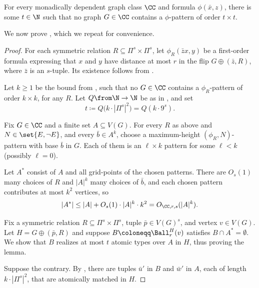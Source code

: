 \begin{corollary}\label{lem:forbidden-patterns}
        For every monadically dependent graph class $\CC$ and formula $\phi(\bar x,z)$, there is some $t\in \N$ such that no graph $G\in \CC$ contains a $\phi$-pattern of order $t \times t$.
\end{corollary}

We now prove , which we repeat for convenience.

\lemBallTypes*
\begin{proof}
    For each symmetric relation $R\subseteq\Pi^s \times \Pi^s$, let $\phi_R(\bar z x,y)$ be a first-order formula expressing that $x$ and $y$ have distance at most $r$ in the flip $G\oplus(\bar z,R)$, where $\bar z$ is an $s$-tuple.
Its existence follows from .

Let $k\ge 1$ be the bound from
     , such that no $G\in\CC$ contains a $\phi_R$-pattern of order $k\times k$, for any $R$.
    Let $Q\from\N\to\N$ be as in , and set
    \[
        t\coloneqq Q\big(k \cdot |\Pi^s|^2\big)=Q(k\cdot 9^s).
    \]

    Fix $G\in\CC$ and a finite set $A\subseteq V(G)$.
    For every $R$ as above and $N\in \set{E,\neg E}$, and every $\bar b\in A^k$, choose a maximum-height $(\phi_R,N)$-pattern with base $\bar b$ in $G$. Each of them is an $\ell\times k$ pattern for some $\ell<k$ (possibly $\ell=0$).

    Let $A^*$ consist of $A$ and all grid-points of the chosen patterns.
    There are $O_s(1)$ many choices of $R$ and $|A|^k$ many choices of $\bar b$, and each chosen pattern contributes at most $k^2$ vertices, so
    \[
        |A^*|\leq |A|+O_s(1)\cdot|A|^k\cdot k^2
        =O_{\CC,r,s}(|A|^k).
    \]

    Fix a symmetric relation $R\subseteq\Pi^s \times \Pi^s$, tuple $\bar p \in V(G)^s$, and vertex $v \in V(G)$. Let
    $H=G\oplus(\bar p,R)$ and suppose $B\coloneqq \Ball_r^H(v)$ satisfies $B\cap A^*=\emptyset$.
    We show that $B$ realizes at most $t$ atomic types over $A$ in $H$, thus proving the lemma.

    Suppose the contrary.
    By , there are tuples $\bar u'$ in $B$ and $\bar w'$ in $A$, each of length $k \cdot |\Pi^s|^2$, that are atomically matched in $H$.


\end{proof}
